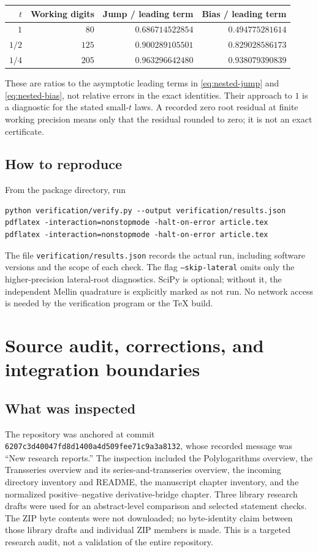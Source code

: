 \documentclass[11pt,a4paper]{article}
\numberwithin{equation}{section}
\theoremstyle{definition}\newtheorem{definition}[theorem]{Definition}
\theoremstyle{remark}\newtheorem{remark}[theorem]{Remark}
\begin{document}
\begin{center}
\begin{tabular}{@{}rrrr@{}}
\toprule
$t$ & Working digits & Jump / leading term & Bias / leading term\\
\midrule
$1$   & $80$  & $0.686714522854$ & $0.494775281614$\\
$1/2$ & $125$ & $0.900289105501$ & $0.829028586173$\\
$1/4$ & $205$ & $0.963296642480$ & $0.938079390839$\\
\bottomrule
\end{tabular}
\end{center}
These are ratios to the asymptotic leading terms in
\eqref{eq:nested-jump} and \eqref{eq:nested-bias}, not relative errors
in the exact identities. Their approach to $1$ is a diagnostic for the
stated small-$t$ laws. A recorded zero root residual at finite working
precision means only that the residual rounded to zero; it is not an
exact certificate.

\subsection{How to reproduce}
From the package directory, run
\begin{verbatim}
python verification/verify.py --output verification/results.json
pdflatex -interaction=nonstopmode -halt-on-error article.tex
pdflatex -interaction=nonstopmode -halt-on-error article.tex
\end{verbatim}
The file \texttt{verification/results.json} records the actual run,
including software versions and the scope of each check. The flag
\texttt{--skip-lateral} omits only the higher-precision lateral-root
diagnostics. SciPy is optional; without it, the independent Mellin
quadrature is explicitly marked as not run. No network access is
needed by the verification program or the TeX build.

\section{Source audit, corrections, and integration boundaries}
\label{sec:audit}

\subsection{What was inspected}
The repository was anchored at commit
\texttt{6207c3d40047fd8d1400a4d509fee71c9a3a8132}, whose recorded
message was ``New research reports.'' The inspection included the
Polylogarithms overview, the Transseries overview and its
series-and-transseries overview, the incoming directory inventory and
README, the manuscript chapter inventory, and the normalized
positive--negative derivative-bridge chapter. Three library research
drafts were used for an abstract-level comparison and selected
statement checks. The ZIP byte contents were not downloaded; no
byte-identity claim between those library drafts and individual ZIP
members is made. This is a targeted research audit, not a validation
of the entire repository.
\end{document}
